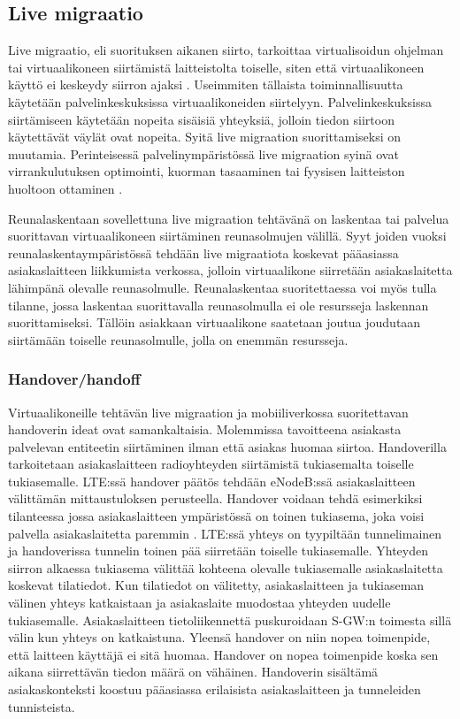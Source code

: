 \subsection{Live migraatio} \label{livemigraatio}

Live migraatio, eli suorituksen aikanen siirto, tarkoittaa virtualisoidun ohjelman tai virtuaalikoneen siirtämistä laitteistolta toiselle, siten että virtuaalikoneen käyttö ei keskeydy siirron ajaksi \cite{clark2005live}. 
Useimmiten tällaista toiminnallisuutta käytetään palvelinkeskuksissa virtuaalikoneiden
siirtelyyn. Palvelinkeskuksissa siirtämiseen käytetään nopeita sisäisiä yhteyksiä,
jolloin tiedon siirtoon käytettävät väylät ovat nopeita. Syitä live migraation
suorittamiseksi on muutamia. Perinteisessä palvelinympäristössä live migraation
syinä ovat virrankulutuksen optimointi, kuorman tasaaminen tai fyysisen
laitteiston huoltoon ottaminen \cite{soni2013comparative}. 

Reunalaskentaan sovellettuna live migraation tehtävänä on laskentaa tai palvelua suorittavan virtuaalikoneen siirtäminen reunasolmujen välillä.
Syyt joiden vuoksi reunalaskentaympäristössä tehdään live migraatiota koskevat pääasiassa asiakaslaitteen liikkumista verkossa, jolloin virtuaalikone siirretään asiakaslaitetta lähimpänä olevalle  reunasolmulle. 
Reunalaskentaa suoritettaessa voi myös tulla tilanne, jossa laskentaa suorittavalla reunasolmulla ei ole resursseja laskennan suorittamiseksi. Tällöin asiakkaan virtuaalikone saatetaan joutua joudutaan siirtämään toiselle reunasolmulle, jolla on enemmän resursseja.  


\subsubsection*{Handover/handoff}%
Virtuaalikoneille tehtävän live migraation ja mobiiliverkossa suoritettavan handoverin ideat ovat samankaltaisia. Molemmissa tavoitteena asiakasta palvelevan entiteetin siirtäminen ilman että asiakas huomaa siirtoa.
Handoverilla tarkoitetaan asiakaslaitteen radioyhteyden siirtämistä tukiasemalta toiselle tukiasemalle. 
LTE:ssä handover päätös tehdään eNodeB:ssä asiakaslaitteen välittämän mittaustuloksen perusteella. 
Handover voidaan tehdä esimerkiksi tilanteessa jossa asiakaslaitteen ympäristössä on toinen tukiasema, joka voisi palvella asiakaslaitetta paremmin \cite[s.~96]{etsilte}.
LTE:ssä yhteys on tyypiltään tunnelimainen ja handoverissa tunnelin toinen pää siirretään toiselle tukiasemalle.
Yhteyden siirron alkaessa tukiasema välittää kohteena olevalle tukiasemalle asiakaslaitetta koskevat tilatiedot. Kun tilatiedot on välitetty, asiakaslaitteen ja tukiaseman välinen yhteys katkaistaan ja asiakaslaite muodostaa yhteyden uudelle tukiasemalle.
Asiakaslaitteen tietoliikennettä puskuroidaan S-GW:n toimesta sillä välin kun yhteys on katkaistuna. Yleensä handover on niin nopea toimenpide, että laitteen käyttäjä ei sitä huomaa.
Handover on nopea toimenpide koska sen aikana siirrettävän tiedon määrä on vähäinen.
Handoverin sisältämä asiakaskonteksti koostuu pääasiassa erilaisista asiakaslaitteen ja tunneleiden tunnisteista.

